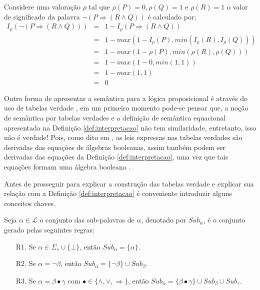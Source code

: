 \begin{exemplo}
  Considere uma valoração $\rho$ tal que $\rho(P) = 0, \rho(Q) = 1$ e $\rho(R) = 1$ o valor de significado da palavra $\neg(P \Rightarrow (R \land Q))$ é calculado por:
  \begin{eqnarray*}\label{eq:ExemploValoracaoA}
    I_\rho(\neg(P \Rightarrow (R \land Q))) & = & 1 - I_\rho(P \Rightarrow (R \land Q))\\
    & = & 1 - max(1 - I_\rho(P), min(I_\rho(R), I_\rho(Q)))\\
    & = & 1 - max(1 - \rho(P), min(\rho(R), \rho(Q)))\\
    & = & 1 - max(1 - 0, min(1, 1))\\
    & = & 1 - max(1, 1)\\
    & = & 0
  \end{eqnarray*}
\end{exemplo}

Outra forma de apresentar a semântica para a lógica proposicional é através do uso de tabelas verdade \cite{judith2021}, em um primeiro momento pode-se pensar que, a noção de semântica por tabelas verdades e a definição de semântica equacional apresentada na Definição \ref{def:interpretacao} não tem similaridade, entretanto, isso não é verdade! Pois, como dito em \cite{joaoPavao2014}, as leis expressas nas tabelas verdades são derivadas das equações de álgebras booleanas, assim também podem ser derivadas das equações da Definição \ref{def:interpretacao}, uma vez que tais equações formam uma álgebra booleana \cite{carmo2013}.

Antes de prosseguir para explicar a construção das tabelas verdade e explicar sua relação com a Definição \ref{def:interpretacao} é conveniente introduzir alguns conceitos chaves.

\begin{definicao}
  Seja $\alpha \in \mathcal{L}$ o conjunto das sub-palavras de $\alpha$, denotado por $Sub_{\alpha}$, é o conjunto gerado pelas seguintes regras:
  \begin{itemize}
       \item[R1.] Se $\alpha \in \Sigma_s \cup \{\bot\}$, então $Sub_\alpha = \{\alpha\}$.
       \item[R2.] Se $\alpha = \neg \beta$, então $Sub_\alpha = \{\neg \beta\} \cup Sub_\beta$.
       \item[R3.] Se $\alpha = \beta \bullet \gamma$  com $\bullet \in \{\land, \lor, \Rightarrow\}$, então $Sub_\alpha = \{\beta \bullet \gamma\} \cup Sub_\beta \cup Sub_\gamma$.
  \end{itemize}
\end{definicao}

